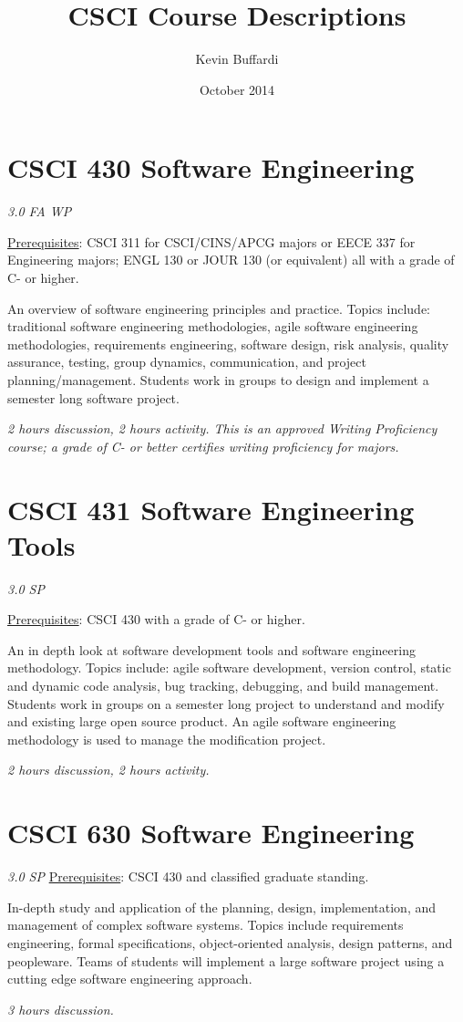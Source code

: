 \documentclass[12pt]{article}
\title{CSCI Course Descriptions}
\author{Kevin Buffardi}
\date{October 2014}
\begin{document}
  \maketitle
  \section*{CSCI 430 Software Engineering}	 	
  \textit{3.0 FA WP}
  
  \underline{Prerequisites}: CSCI 311 for CSCI/CINS/APCG majors or EECE 337 for Engineering majors; ENGL 130 or JOUR 130 (or equivalent) all with a grade of C- or higher.

  An overview of software engineering principles and practice. Topics include: traditional software engineering methodologies, agile software engineering methodologies, requirements engineering, software design, risk analysis, quality assurance, testing, group dynamics, communication, and project planning/management. Students work in groups to design and implement a semester long software project. 

  \textit{2 hours discussion, 2 hours activity. This is an approved Writing Proficiency course; a grade of C- or better certifies writing proficiency for majors.}
  
  \section*{CSCI 431 Software Engineering Tools}
  \textit{3.0 SP}	 

  \underline{Prerequisites}: CSCI 430 with a grade of C- or higher.

  An in depth look at software development tools and software engineering methodology. Topics include: agile software development, version control, static and dynamic code analysis, bug tracking, debugging, and build management. Students work in groups on a semester long project to understand and modify and existing large open source product. An agile software engineering methodology is used to manage the modification project. 

  \textit{2 hours discussion, 2 hours activity.}

  \section*{CSCI 630	Software Engineering}
  \textit{3.0 SP}
  \underline{Prerequisites}: CSCI 430 and classified graduate standing.

  In-depth study and application of the planning, design, implementation, and management of complex software systems. Topics include requirements engineering, formal specifications, object-oriented analysis, design patterns, and peopleware. Teams of students will implement a large software project using a cutting edge software engineering approach. 

  \textit{3 hours discussion.}
\end{document}
